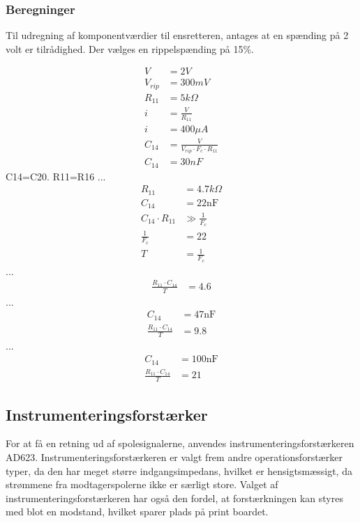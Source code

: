 
\subsubsection{Beregninger}
Til udregning af komponentværdier til ensretteren, antages at en spænding på 2 volt er tilrådighed. Der vælges en rippelspænding på 15\%. 

\begin{align}
	V & = 2V \nonumber \\
	V_{rip} & = 300mV \nonumber \\
	R_{11} & = 5k \Omega \nonumber \\
	i & = \frac{V}{R_{11}} \nonumber \\
	i & = 400 \mu A \nonumber \\
	C_{14} & = \frac{V}{V_{rip} \cdot F_c \cdot R_{11}}\\
		C_{14} & = 30nF \nonumber
\end{align}
	C14=C20. R11=R16
...
\begin{align}
		R_{11} & = 4.7k \Omega \nonumber \\
		C_{14} & = 22 \si{\nano\farad} \nonumber \\
		C_{14} \cdot R_{11} & \gg \frac{1}{F_c} \\
		\frac{1}{F_c} & = 22 \\
		T & = \frac{1}{F_c}
\end{align}
...
	\begin{align}
		\frac{R_{11} \cdot C_{14}}{T} & = 4.6
	\end{align}
...
\begin{align}
	C_{14} & = 47 \si{\nano\farad} \nonumber \\
	\frac{R_{11} \cdot C_{14}}{T} & = 9.8
	\end{align}
...
\begin{align}
	C_{14} & = 100 \si{\nano\farad} \nonumber \\
	\frac{R_{11} \cdot C_{14}}{T} & = 21
	\end{align}

\subsection{Instrumenteringsforstærker}
For at få en retning ud af spolesignalerne, anvendes instrumenteringsforstærkeren AD623. Instrumenteringsforstærkeren er valgt frem andre operationsforstærker typer, da den har meget større indgangsimpedans, hvilket er hensigtsmæssigt, da strømmene fra modtagerspolerne ikke er særligt store. Valget af instrumenteringsforstærkeren har også den fordel, at forstærkningen kan styres med blot en modstand, hvilket sparer plads på print boardet.



